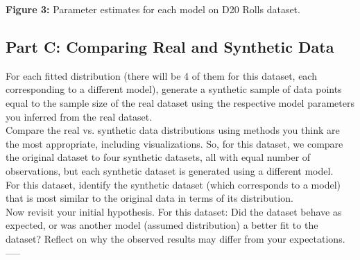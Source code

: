 \begin{center}
\textbf{Figure 3:} Parameter estimates for each model on D20 Rolls dataset.
\end{center}
\newpage

\subsection{Part C: Comparing Real and Synthetic Data}

For each fitted distribution (there will be 4 of them for this dataset, each corresponding to a different model), generate a synthetic sample of data points equal to the sample size of the real dataset using the respective model parameters you inferred from the real dataset.\\

Compare the real vs. synthetic data distributions using methods you think are the most appropriate, including visualizations. So, for this dataset, we compare the original dataset to four synthetic datasets, all with equal number of observations, but each synthetic dataset is generated using a different model.\\

For this dataset, identify the synthetic dataset (which corresponds to a model) that is most similar to the original data in terms of its distribution.\\

Now revisit your initial hypothesis. For this dataset: Did the dataset behave as expected, or was another model (assumed distribution) a better fit to the dataset? Reflect on why the observed results may differ from your expectations.\\
-----\\
